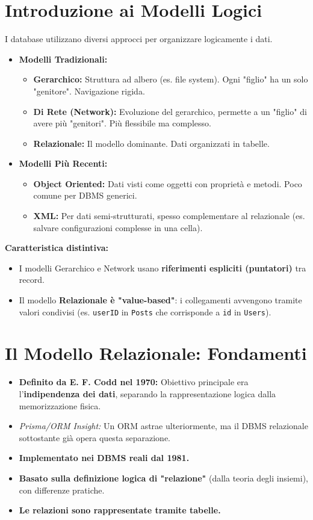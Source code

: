 \section{Introduzione ai Modelli Logici}
I database utilizzano diversi approcci per organizzare logicamente i dati.
\begin{itemize}
	\item \textbf{Modelli Tradizionali:}
	\begin{itemize}
		\item \textbf{Gerarchico:} Struttura ad albero (es. file system). Ogni "figlio" ha un solo "genitore". Navigazione rigida.
		\item \textbf{Di Rete (Network):} Evoluzione del gerarchico, permette a un "figlio" di avere più "genitori". Più flessibile ma complesso.
		\item \textbf{Relazionale:} Il modello dominante. Dati organizzati in tabelle.
	\end{itemize}
	\item \textbf{Modelli Più Recenti:}
	\begin{itemize}
		\item \textbf{Object Oriented:} Dati visti come oggetti con proprietà e metodi. Poco comune per DBMS generici.
		\item \textbf{XML:} Per dati semi-strutturati, spesso complementare al relazionale (es. salvare configurazioni complesse in una cella).
	\end{itemize}
\end{itemize}

\textbf{Caratteristica distintiva:}
\begin{itemize}
	\item I modelli Gerarchico e Network usano \textbf{riferimenti espliciti (puntatori)} tra record.
	\item Il modello \textbf{Relazionale è "value-based"}: i collegamenti avvengono tramite valori condivisi (es. \texttt{userID} in \texttt{Posts} che corrisponde a \texttt{id} in \texttt{Users}).
\end{itemize}

\section{Il Modello Relazionale: Fondamenti}
\begin{itemize}
	\item \textbf{Definito da E. F. Codd nel 1970:} Obiettivo principale era l'\textbf{indipendenza dei dati}, separando la rappresentazione logica dalla memorizzazione fisica.
	\item \textit{Prisma/ORM Insight:} Un ORM astrae ulteriormente, ma il DBMS relazionale sottostante già opera questa separazione.
	\item \textbf{Implementato nei DBMS reali dal 1981.}
	\item \textbf{Basato sulla definizione logica di "relazione"} (dalla teoria degli insiemi), con differenze pratiche.
	\item \textbf{Le relazioni sono rappresentate tramite tabelle.}
\end{itemize}


